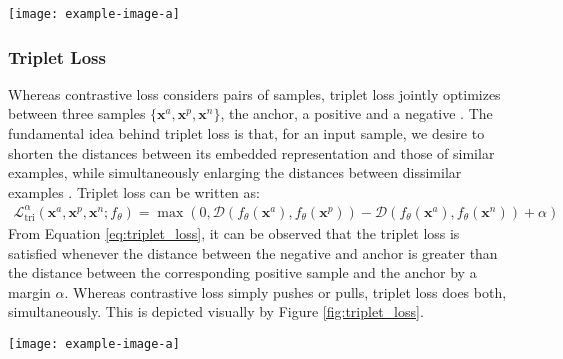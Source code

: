 	\begin{center}
		\begin{figure*}[h]
			\centering
			\texttt{[image: example-image-a]}
			\caption[Pairwise Loss]{}
			\label{fig:contrastive_loss}
		\end{figure*}
	\end{center}
	
	
	\subsubsection{Triplet Loss}
	Whereas contrastive loss considers pairs of samples, triplet loss jointly optimizes between three samples $\{\bm{x}^{a}, \bm{x}^{p}, \bm{x}^{n}\}$, the anchor, a positive and a negative \citep{Hermans2017DefenseTripletLoss,Schroff2015FaceNet, Deng2019ArcFaceAngularMarginLoss}. The fundamental idea behind triplet loss is that, for an input sample, we desire to shorten the distances between its embedded representation and those of similar examples, while simultaneously enlarging the distances between dissimilar examples \citep{Sohn2016NPairLoss}. Triplet loss can be written as:
	\begin{align}
	\mathcal{L}^{\alpha}_{\text{tri}}(\bm{x}^{a},\bm{x}^{p},\bm{x}^{n};f_{\theta}) = \max(0,\mathcal{D}(f_{\theta}(\bm{x}^{a}),f_{\theta}(\bm{x}^{p})) - \mathcal{D}(f_{\theta}(\bm{x}^{a}),f_{\theta}(\bm{x}^{n})) + \alpha )
	\label{eq:triplet_loss}
	\end{align}
	\noindent
	From Equation \ref{eq:triplet_loss}, it can be observed that the triplet loss is satisfied whenever the distance between the negative and anchor is greater than the distance between the corresponding positive sample and the anchor by a margin $\alpha$.  Whereas contrastive loss simply pushes or pulls, triplet loss does both, simultaneously.  This is depicted visually by Figure \ref{fig:triplet_loss}.
	
	\begin{center}
		\begin{figure*}[h]
			\centering
			\texttt{[image: example-image-a]}
			\caption[Triplet Loss]{}
			\label{fig:triplet_loss}
		\end{figure*}
	\end{center}

